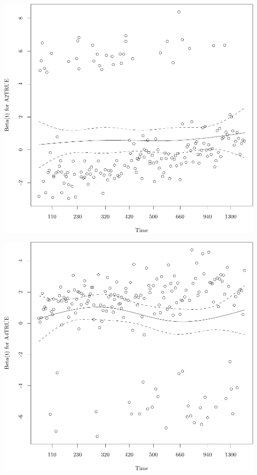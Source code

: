 \documentclass{article}\usepackage[]{graphicx}\usepackage[]{color}
\makeatletter
\def\maxwidth{ %
  \ifdim\Gin@nat@width>\linewidth
    \linewidth
  \else
    \Gin@nat@width
  \fi
}
\newenvironment{knitrout}{}{} %
\makeatother
\begin{document}
\begin{knitrout}
{}




{\centering \includegraphics[width=\maxwidth]{figure/05-eda-ph-check-full-3-6} 

}




{\centering \includegraphics[width=\maxwidth]{figure/05-eda-ph-check-full-3-7} 

}



\end{knitrout}
\end{document}
